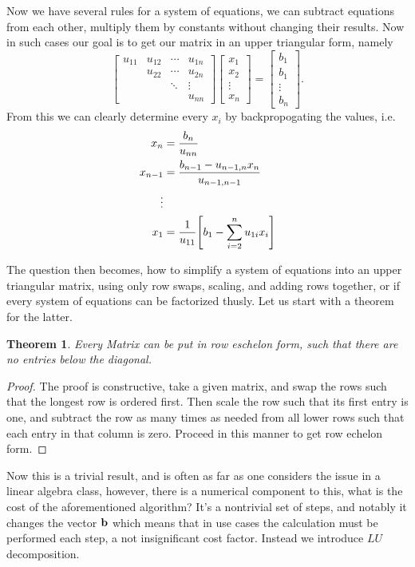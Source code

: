 \documentclass[12pt]{extarticle}
\newtheorem*{theorem}{Theorem}
\newcommand{\m}[1]{\begin{bmatrix} #1 \end{bmatrix}}
\begin{document}
Now we have several rules for a system of equations, we can subtract equations from each other, multiply them by constants without changing their results. Now in such cases our goal is to get our matrix in an upper triangular form, namely 
\[
  \m{ 
    u_{11} & u_{12} & \cdots & u_{1n} \\
           & u_{22} & \cdots & u_{2n} \\
           &        & \ddots & \vdots \\
           &        &        & u_{nn}
  }
  \m{ x_1 \\ x_2 \\ \vdots \\ x_n } 
  = 
  \m{ b_1 \\ b_1 \\ \vdots \\ b_n }.
\]
From this we can clearly determine every $x_i$ by backpropogating the values, i.e.
\begin{align*}
  x_n     &= \frac{b_n}{u_{nn}} \\
  x_{n-1} &= \frac{b_{n-1} - u_{n-1,n}x_n}{u_{n-1,n-1}} \\
  \vdots  \\
  x_1     &= \frac{1}{u_{11}} \qty[ b_1 - \sum_{i = 2}^n u_{1i} x_i]
\end{align*}

The question then becomes, how to simplify a system of equations into an upper triangular matrix, using only row swaps, scaling, and adding rows together, or if every system of equations can be factorized thusly. Let us start with a theorem for the latter. 

\begin{theorem} Every Matrix can be put in row eschelon form, such that there are no entries below the diagonal. 
\end{theorem}

\begin{proof}
  The proof is constructive, take a given matrix, and swap the rows such that the longest row is ordered first. Then scale the row such that its first entry is one, and subtract the row as many times as needed from all lower rows such that each entry in that column is zero. Proceed in this manner to get row echelon form. 
\end{proof}

Now this is a trivial result, and is often as far as one considers the issue in a linear algebra class, however, there is a numerical component to this, what is the cost of the aforementioned algorithm? It's a nontrivial set of steps, and notably it changes the vector $\vb{b}$ which means that in use cases the calculation must be performed each step, a not insignificant cost factor. Instead we introduce $LU$ decomposition.
\end{document}
